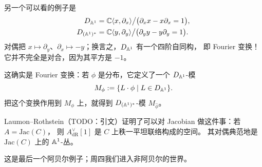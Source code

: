 \begin{example}
另一个可以看的例子是
\begin{align*}
D_{\mathbb{A}^1}&=\mathbb{C}\langle x,\partial_x\rangle\big/\bigl(\partial_x x-x\partial_x=1\bigr),\\
D_{(\mathbb{A}^1)^*}&=\mathbb{C}\langle y,\partial_y\rangle\big/\bigl(\partial_y y-y\partial_y=1\bigr).
\end{align*}
对偶把 $x\mapsto\partial_y$、$\partial_x\mapsto-y$；换言之，$D_{\mathbb{A}^1}$ 有一个四阶自同构，
即 Fourier 变换！它并不完全是对合，因为其平方是 $-1$。

这确实是 Fourier 变换：若 $\phi$ 是分布，它定义了一个 $D_{\mathbb{A}^1}$-模
\[
M_\phi:=\{L\cdot\phi\mid L\in D_{\mathbb{A}^1}\}.
\]
把这个变换作用到 $M_\phi$ 上，就得到 $D_{(\mathbb{A}^1)^*}$-模 $M_{\hat\phi}$。

Laumon–Rothstein（TODO：引文）证明了可以对 Jacobian 做这件事：若 $A=\mathrm{Jac}(C)$，
则 $A^\vee_{\mathrm{dR}}[1]$ 是 $C$ 上秩一平坦联络构成的空间。
其对偶典范地是 $\mathrm{Jac}(C)$ 上的 $\mathbb{A}^1$-丛。

这是最后一个阿贝尔例子；周四我们进入非阿贝尔的世界。
\end{example}
